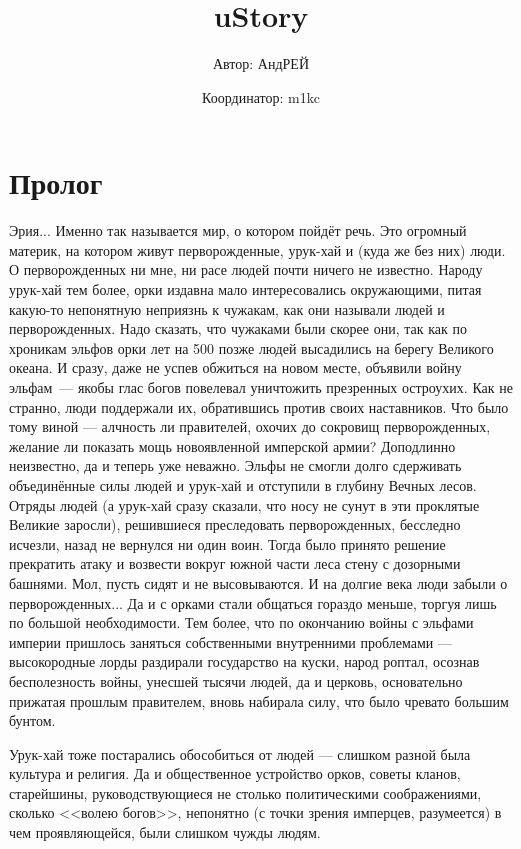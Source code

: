 \documentclass[12pt,a4paper]{book}
\title{\textbf{uStory}}
\author{Автор: АндРЕЙ \and Координатор: m1kc}
\begin{document}
\maketitle

\chapter*{Пролог}

Эрия... Именно так называется мир, о котором пойдёт речь. Это огромный материк, на котором живут перворожденные, урук-хай и (куда же без них) люди. О перворожденных ни мне, ни расе людей почти ничего не известно. Народу урук-хай тем более, орки издавна мало интересовались окружающими, питая какую-то непонятную неприязнь к чужакам, как они называли людей и перворожденных. Надо сказать, что чужаками были скорее они, так как по хроникам эльфов орки лет на 500 позже людей высадились на берегу Великого океана. И сразу, даже не успев обжиться на новом месте, объявили войну \mbox{эльфам ---} якобы глас богов повелевал уничтожить презренных остроухих. Как не странно, люди поддержали их, обратившись против своих наставников. Что было тому виной --- алчность ли правителей, охочих до сокровищ перворожденных, желание ли показать мощь новоявленной имперской армии? Доподлинно неизвестно, да и теперь уже неважно. Эльфы не смогли долго сдерживать объединённые силы людей и урук-хай и отступили в глубину Вечных лесов. Отряды людей (а урук-хай сразу сказали, что носу не сунут в эти проклятые Великие заросли), решившиеся преследовать перворожденных, бесследно исчезли, назад не вернулся ни один воин. Тогда было принято решение прекратить атаку и возвести вокруг южной части леса стену с дозорными башнями. Мол, пусть сидят и не высовываются. И на долгие века люди забыли о перворожденных... Да и с орками стали общаться гораздо меньше, торгуя лишь по большой необходимости. Тем более, что по окончанию войны с эльфами империи пришлось заняться собственными внутренними проблемами --- высокородные лорды раздирали государство на куски, народ роптал, осознав бесполезность войны, унесшей тысячи людей, да и церковь, основательно прижатая прошлым правителем, вновь набирала силу, что было чревато большим бунтом.

Урук-хай тоже постарались обособиться от людей --- слишком разной была культура и религия. Да и общественное устройство орков, советы кланов, старейшины, руководствующиеся не столько политическими соображениями, сколько <<волею богов>>, непонятно (с точки зрения имперцев, разумеется) в чем проявляющейся, были слишком чужды людям.
\end{document}
